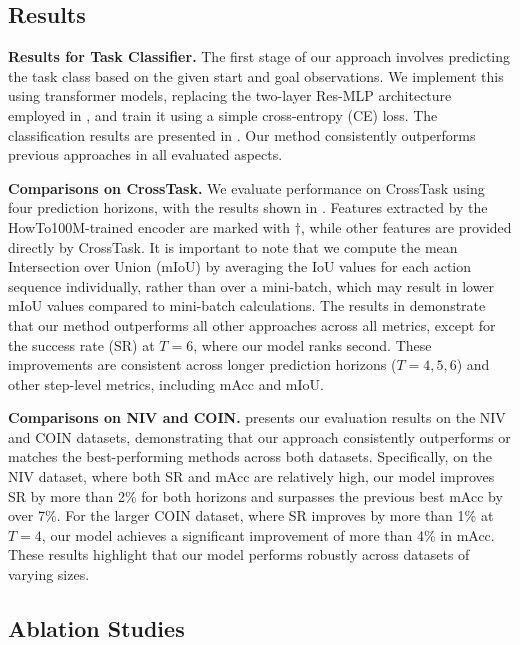 \subsection{Results}
\label{sec:results}



 



\textbf{Results for Task Classifier.} The first stage of our approach involves predicting the task class based on the given start and goal observations. We implement this using transformer models, replacing the two-layer Res-MLP architecture employed in \citet{wang2023pdpp}, and train it using a simple cross-entropy (CE) loss. The classification results are presented in . Our method consistently outperforms previous approaches in all evaluated aspects.


\textbf{Comparisons on CrossTask.} We evaluate performance on CrossTask using four prediction horizons, with the results shown in . Features extracted by the HowTo100M-trained encoder are marked with $\dagger$, while other features are provided directly by CrossTask. It is important to note that we compute the mean Intersection over Union (mIoU) by averaging the IoU values for each action sequence individually, rather than over a mini-batch, which may result in lower mIoU values compared to mini-batch calculations. The results in  demonstrate that our method outperforms all other approaches across all metrics, except for the success rate (SR) at $T = 6$, where our model ranks second. These improvements are consistent across longer prediction horizons ($T = 4, 5, 6$) and other step-level metrics, including mAcc and mIoU.


\textbf{Comparisons on NIV and COIN.}  presents our evaluation results on the NIV and COIN datasets, demonstrating that our approach consistently outperforms or matches the best-performing methods across both datasets. Specifically, on the NIV dataset, where both SR and mAcc are relatively high, our model improves SR by more than 2\% for both horizons and surpasses the previous best mAcc by over 7\%. For the larger COIN dataset, where SR improves by more than 1\% at $T=4$, our model achieves a significant improvement of more than 4\% in mAcc. These results highlight that our model performs robustly across datasets of varying sizes.

\subsection{Ablation Studies} 






